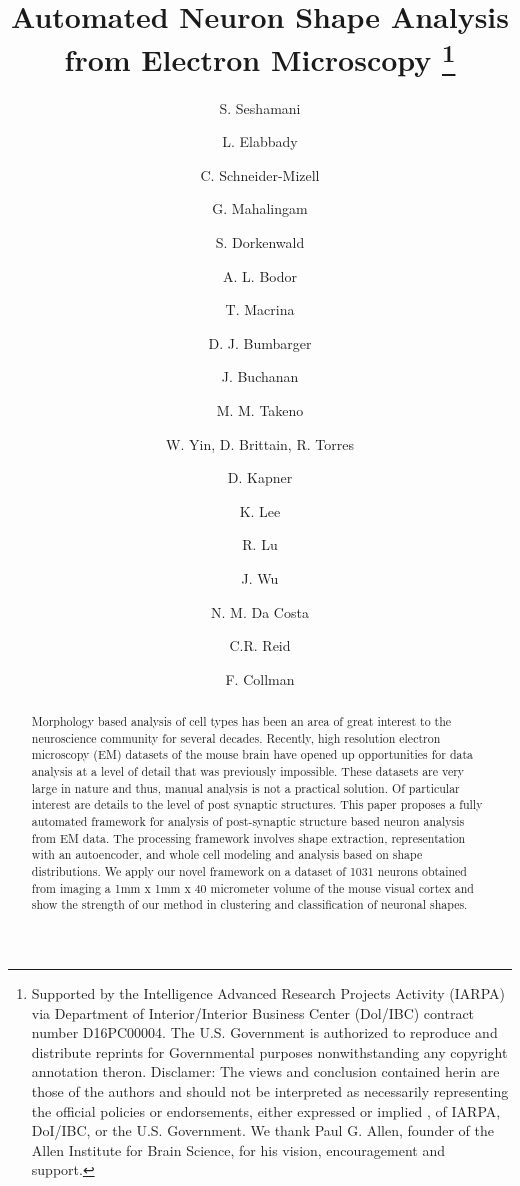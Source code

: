 \documentclass[runningheads]{llncs}
\begin{document}
\title{Automated Neuron Shape Analysis from Electron Microscopy  \thanks{Supported by the Intelligence Advanced Research Projects Activity (IARPA) via Department of Interior/Interior Business Center (Dol/IBC) contract number D16PC00004. The U.S. Government is authorized to reproduce and distribute reprints for Governmental purposes nonwithstanding any copyright annotation theron. Disclamer: The views and conclusion contained herin are those of the authors and should not be interpreted as necessarily representing the official policies or endorsements, either expressed or implied , of IARPA, DoI/IBC, or the U.S. Government. We thank Paul G. Allen, founder of the Allen Institute for Brain Science, for his vision, encouragement and support.}}



\author{S. Seshamani \and L. Elabbady \and C. Schneider-Mizell \and G. Mahalingam \and S. Dorkenwald \and A. L. Bodor \and T. Macrina \and D. J. Bumbarger \and J. Buchanan \and M. M. Takeno \and W. Yin, D. Brittain, R. Torres \and D. Kapner \and K. Lee \and R. Lu \and J. Wu \and N. M. Da Costa \and C.R. Reid \and F. Collman}



\maketitle              

\begin{abstract}
Morphology based analysis of cell types has been an area of great interest to the neuroscience community for several decades. Recently, high resolution electron microscopy (EM) datasets of the mouse brain have opened up opportunities for data analysis at a level of detail that was previously impossible. These datasets are very large in nature and thus, manual analysis is not a practical solution. Of particular interest are details to the level of post synaptic structures. This paper proposes a fully automated framework for analysis of post-synaptic structure based neuron analysis from EM data. The processing framework involves shape extraction, representation with an autoencoder, and whole cell modeling and analysis based on shape distributions. We apply our novel framework on a dataset of 1031 neurons obtained from imaging a 1mm x 1mm x 40 micrometer volume of the mouse visual cortex and show the strength of our method in clustering and classification of neuronal shapes.

\end{abstract}
\end{document}
